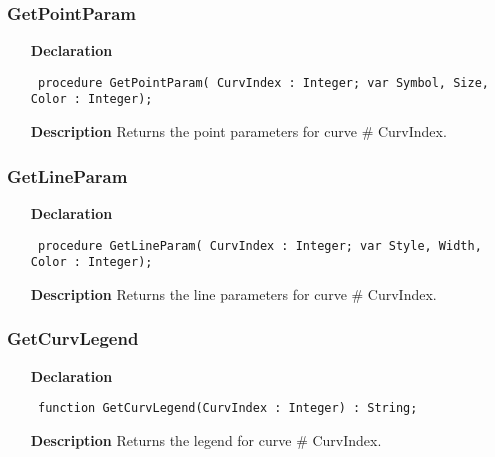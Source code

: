 \documentclass[12pt,a4paper,oneside]{report}
\newcommand{\declarationitem}[1]{\textbf{#1}}
\newcommand{\descriptiontitle}[1]{\textbf{#1}}
\newcommand{\code}[1]{\texttt{#1}}
\begin{document}
\subsubsection{GetPointParam}
\label{uplot-GetPointParam}
\begin{itemize}\item[\declarationitem{Declaration}\hfill]
	\begin{flushleft}
		\code{
			procedure GetPointParam( CurvIndex : Integer; var Symbol, Size, Color : Integer);}
		
	\end{flushleft}
	
	\par
	\item[\descriptiontitle{Description}]
	Returns the point parameters for curve {\#} CurvIndex.
	
\end{itemize}
\subsubsection{GetLineParam}
\label{uplot-GetLineParam}
\begin{itemize}\item[\declarationitem{Declaration}\hfill]
	\begin{flushleft}
		\code{
			procedure GetLineParam( CurvIndex : Integer; var Style, Width, Color : Integer);}
		
	\end{flushleft}
	
	\par
	\item[\descriptiontitle{Description}]
	Returns the line parameters for curve {\#} CurvIndex.
	
\end{itemize}
\subsubsection{GetCurvLegend}
\label{uplot-GetCurvLegend}
\begin{itemize}\item[\declarationitem{Declaration}\hfill]
	\begin{flushleft}
		\code{
			function GetCurvLegend(CurvIndex : Integer) : String;}
		
	\end{flushleft}
	
	\par
	\item[\descriptiontitle{Description}]
	Returns the legend for curve {\#} CurvIndex.
	
\end{itemize}
\end{document}
